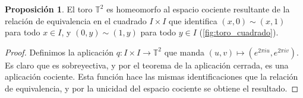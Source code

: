 \documentclass[10pt]{report}
\newcommand{\Toro}{\mathbb{T}^2}
\theoremstyle{definition}
\newtheorem{prop}[defin]{Proposición}
\begin{document}
%
%
%
%
%
%
%

\begin{prop}%
\label{prop:toro_cuadrado}
El toro $\Toro$ es homeomorfo al espacio cociente resultante de la relación de equivalencia en el cuadrado $I\times I$ que identifica $(x,0)\sim (x,1)$ para todo $x\in I$, y $(0,y)\sim(1,y)$ para todo $y\in I$ (\autoref{fig:toro_cuadrado}). 
\end{prop}
\begin{proof}
Definimos la aplicación $q:I\times I \to \Toro$ que manda $(u,v)\mapsto (e^{2\pi iu},e^{2\pi iv})$. Es claro que es sobreyectiva, y por el teorema de la aplicación cerrada, es una aplicación cociente. Esta función hace las mismas identificaciones que la relación de equivalencia, y por la unicidad del espacio cociente se obtiene el resultado.
\end{proof}
\end{document}
